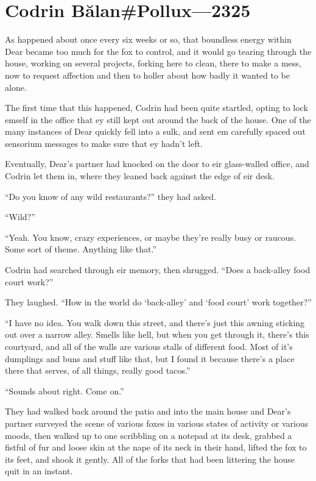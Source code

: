 \hypertarget{codrin-bux103lanpollux-2325}{%
\chapter{Codrin Bălan\#Pollux—2325}\label{codrin-bux103lanpollux-2325}}

As happened about once every six weeks or so, that boundless energy within Dear became too much for the fox to control, and it would go tearing through the house, working on several projects, forking here to clean, there to make a mess, now to request affection and then to holler about how badly it wanted to be alone.

The first time that this happened, Codrin had been quite startled, opting to lock emself in the office that ey still kept out around the back of the house. One of the many instances of Dear quickly fell into a sulk, and sent em carefully spaced out sensorium messages to make sure that ey hadn't left.

Eventually, Dear's partner had knocked on the door to eir glass-walled office, and Codrin let them in, where they leaned back against the edge of eir desk.

``Do you know of any wild restaurants?'' they had asked.

``Wild?''

``Yeah. You know, crazy experiences, or maybe they're really busy or raucous. Some sort of theme. Anything like that.''

Codrin had searched through eir memory, then shrugged. ``Does a back-alley food court work?''

They laughed. ``How in the world do `back-alley' and `food court' work together?''

``I have no idea. You walk down this street, and there's just this awning sticking out over a narrow alley. Smells like hell, but when you get through it, there's this courtyard, and all of the walls are various stalls of different food. Most of it's dumplings and buns and stuff like that, but I found it because there's a place there that serves, of all things, really good tacos.''

``Sounds about right. Come on.''

They had walked back around the patio and into the main house and Dear's partner surveyed the scene of various foxes in various states of activity or various moods, then walked up to one scribbling on a notepad at its desk, grabbed a fistful of fur and loose skin at the nape of its neck in their hand, lifted the fox to its feet, and shook it gently. All of the forks that had been littering the house quit in an instant.

